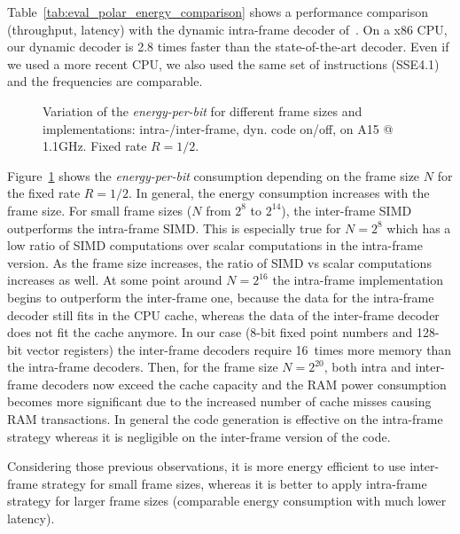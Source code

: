 Table~\ref{tab:eval_polar_energy_comparison} shows a performance comparison
(throughput, latency) with the dynamic intra-frame decoder of~\cite{Giard2014}.
On a x86 CPU, our dynamic decoder is 2.8 times faster than the state-of-the-art
decoder. Even if we used a more recent CPU, we also used the same set of
instructions (SSE4.1) and the frequencies are comparable.

\begin{figure}[htp]
  \centering
  \quad
  \caption{Variation of the \emph{energy-per-bit} for different frame sizes and
    implementations: intra-/inter-frame, dyn. code on/off, on A15 @ 1.1GHz.
    Fixed rate $R = 1/2$.}
  \label{plot:eval_polar_sc_energy_implems_vs}
\end{figure}

Figure~\ref{plot:eval_polar_sc_energy_implems_vs} shows the
\emph{energy-per-bit} consumption depending on the frame size $N$ for the fixed
rate $R = 1/2$. In general, the energy consumption increases with the frame
size. For small frame sizes ($N$ from $2^{8}$ to $2^{14}$), the inter-frame SIMD
outperforms the intra-frame SIMD. This is especially true for $N = 2^8$ which
has a low ratio of SIMD computations over scalar computations in the intra-frame
version. As the frame size increases, the ratio of SIMD vs scalar computations
increases as well. At some point around $N = 2^{16}$ the intra-frame
implementation begins to outperform the inter-frame one, because the data for
the intra-frame decoder still fits in the CPU cache, whereas the data of the
inter-frame decoder does not fit the cache anymore. In our case (8-bit fixed
point numbers and 128-bit vector registers) the inter-frame decoders require
16~times more memory than the intra-frame decoders. Then, for the frame size
$N = 2^{20}$, both intra and inter-frame decoders now exceed the cache capacity
and the RAM power consumption becomes more significant due to the increased
number of cache misses causing RAM transactions. In general the code generation
is effective on the intra-frame strategy whereas it is negligible on the
inter-frame version of the code.

Considering those previous observations, it is more energy efficient to use
inter-frame strategy for small frame sizes, whereas it is better to apply
intra-frame strategy for larger frame sizes (comparable energy consumption with
much lower latency).

